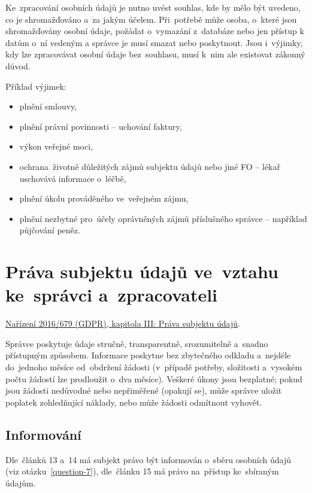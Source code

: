 Ke~zpracování osobních údajů je nutno uvést souhlas, kde by mělo být uvedeno, co je shromažďováno a~za jakým účelem. Při~potřebě může osoba, o~které jsou shromažďovány osobní údaje, požádat o~vymazání z~databáze nebo jen přístup k datům o~ní vedeným a správce je musí smazat nebo poskytnout. Jsou i~výjimky, kdy lze zpracovávat osobní údaje bez~souhlasu, musí k~nim ale existovat zákonný důvod.

Příklad výjimek:

\begin{itemize}
    \item plnění smlouvy,
    \item plnění právní povinnosti -- uchování faktury,
    \item výkon veřejné moci,
    \item ochrana~životně důležitých zájmů subjektu údajů nebo jiné FO -- lékař uschovává informace o~léčbě,
    \item plnění úkolu prováděného ve~veřejném zájmu,
    \item plnění nezbytné pro~účely oprávněných zájmů příslušného správce -- například půjčování peněz.
\end{itemize}





\clearpage
\section{Práva subjektu údajů ve~vztahu ke~správci a~zpracovateli}

\href{https://eur-lex.europa.eu/legal-content/CS/TXT/HTML/?uri=CELEX:32016R0679#d1e2150-1-1}{Nařízení 2016/679 (GDPR), kapitola III: Práva subjektu údajů}.

Správce poskytuje údaje stručně, transparentně, srozumitelně a~snadno přístupným způsobem. Informace poskytne bez zbytečného odkladu a~nejdéle do~jednoho měsíce od~obdržení žádosti (v~případě potřeby, složitosti a~vysokém počtu žádostí lze prodloužit o~dva měsíce). Veškeré úkony jsou bezplatné; pokud jsou žádosti nedůvodné nebo nepřiměřené (opakují se), může správce uložit poplatek zohledňující náklady, nebo může žádosti odmítnout vyhovět.

\subsection*{Informování}

Dle~článků 13 a~14 má subjekt právo být informován o~sběru osobních údajů (viz otázku~\ref{question-7}), dle~článku 15 má právo na~přístup ke~sbíraným údajům.


